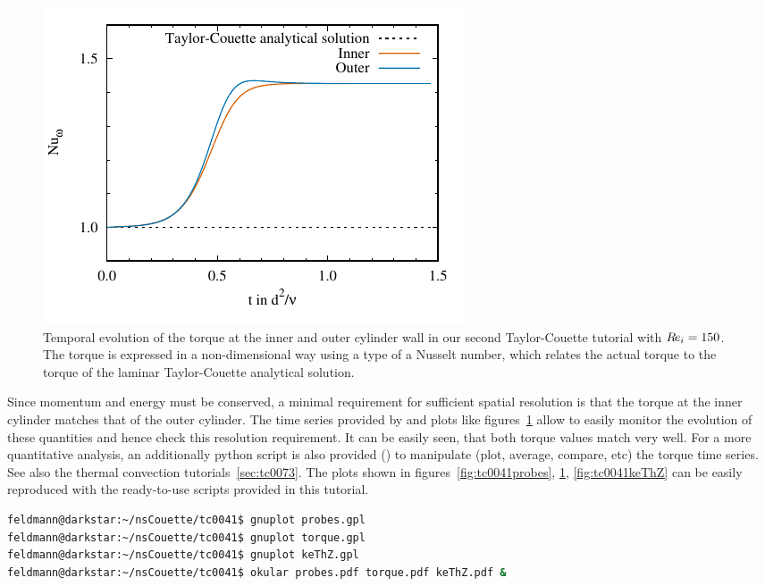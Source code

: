 \documentclass[a4paper, 11pt, DIV=11]{scrartcl}
\begin{document}
\begin{figure}[htb]
\centering
\includegraphics[scale=1.0, trim=0mm 0mm 0mm 0mm, clip=true]{figures/tc0041/torque}
\caption{Temporal evolution of the torque at the inner and outer cylinder
wall in our second Taylor-Couette tutorial  with $R\hspace{-0.1em}e_{i}=\num{150}$.
The torque is expressed in a non-dimensional way using a type of a Nusselt
number, which relates the actual torque to the torque of the laminar
Taylor-Couette analytical solution.}
\label{fig:tc0041torque}
\end{figure}
Since momentum and energy must be conserved, a minimal requirement
for sufficient spatial resolution is that the torque at the inner cylinder
matches that of the outer cylinder. The time series provided by \nsc and
plots like figures~\ref{fig:tc0041torque} allow to easily monitor the
evolution of these quantities and hence check this resolution requirement.
It can be easily seen, that both torque values match very well. For a more
quantitative analysis, an additionally python script is also provided
() to manipulate (plot, average,
compare, etc) the torque time series. See also the thermal convection
tutorials~\ref{sec:tc0073}.
The plots shown in figures~\ref{fig:tc0041probes}, \ref{fig:tc0041torque},
\ref{fig:tc0041keThZ} can be easily reproduced with the ready-to-use
\gnuplot scripts provided in this tutorial.
\begin{lstlisting}[language=bash]
feldmann@darkstar:~/nsCouette/tc0041$ gnuplot probes.gpl
feldmann@darkstar:~/nsCouette/tc0041$ gnuplot torque.gpl
feldmann@darkstar:~/nsCouette/tc0041$ gnuplot keThZ.gpl
feldmann@darkstar:~/nsCouette/tc0041$ okular probes.pdf torque.pdf keThZ.pdf &
\end{lstlisting}
\end{document}
